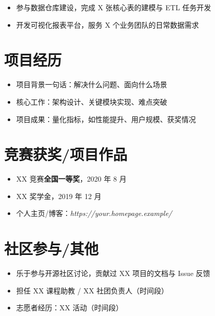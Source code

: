 \documentclass{resume}
\begin{document}
\begin{itemize}
  \item 参与数据仓库建设，完成 X 张核心表的建模与 ETL 任务开发
  \item 开发可视化报表平台，服务 X 个业务团队的日常数据需求
\end{itemize}

\section{项目经历}
\begin{itemize}
  \item 项目背景一句话：解决什么问题、面向什么场景
  \item 核心工作：架构设计、关键模块实现、难点突破
  \item 项目成果：量化指标，如性能提升、用户规模、获奖情况
\end{itemize}

\section{竞赛获奖/项目作品}
\begin{itemize}[parsep=0.2ex]
  \item XX 竞赛\textbf{全国一等奖}，2020 年 8 月
  \item XX 奖学金，2019 年 12 月
  \item 个人主页/博客：\textit{https://your.homepage.example/}
\end{itemize}

\section{社区参与/其他}
\begin{itemize}[parsep=0.2ex]
  \item 乐于参与开源社区讨论，贡献过 XX 项目的文档与 Issue 反馈
  \item 担任 XX 课程助教 / XX 社团负责人（时间段）
  \item 志愿者经历：XX 活动（时间段）
\end{itemize}

%
%
\end{document}
